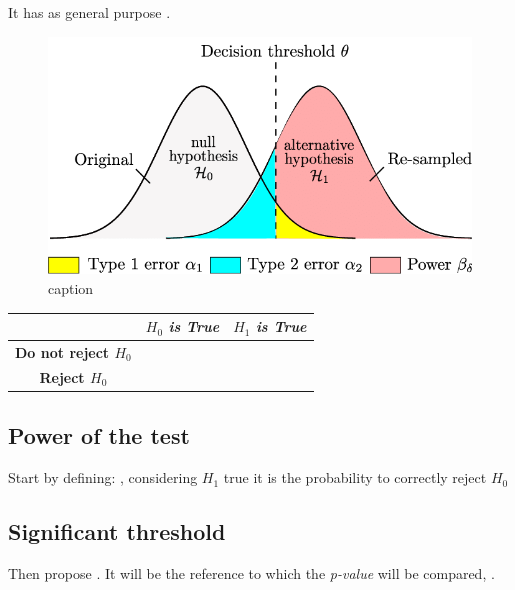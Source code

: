 It has as general purpose .
\begin{figure}[H]
    \begin{center}
        \includegraphics[width=\textwidth]{./chapters/2_statistics/04_frequentist_approach/6_images/1_statistical_hypothesis_testing.png}
    \end{center}
    \caption{caption}
    \label{fig:4.6.1_statistical_hypothesis_testing}
\end{figure}

\begin{center}
    \begin{tabular}{*{3}{|c}|}
    \hline
    & \textbf{$H_{0}$ \emph{is True}} & \textbf{$H_{1}$ \emph{is True}}\\
    \hline
        \textbf{Do not reject $H_{0}$} &  & \\
    \hline
        \textbf{Reject $H_{0}$} &  & \\
    \hline
    \end{tabular}
\end{center}

\subsection{Power of the test}
Start by defining: , considering $H_{1}$ true it is the probability 
to correctly reject $H_{0}$

\subsection{Significant threshold}
Then propose . It will be the
reference to which the \emph{p-value} will be compared, .

